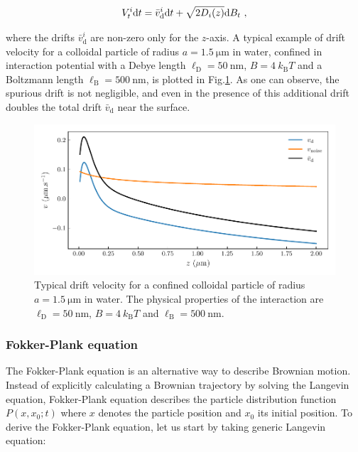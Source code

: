 \begin{equation}
	V_t^i \textnormal{d}t  = \bar{v}_\mathrm{d} ^i \textnormal{d}t + \sqrt{2D_i (z)}  \textnormal{d}B_t ~,
	\label{Eq.langevin_confined}
\end{equation}

where the drifts $\bar{v}_\mathrm{d} ^i $ are non-zero only for the $z$-axis. A typical example of drift velocity for a colloidal particle of radius $a = 1.5 ~\mathrm{\mu m}$ in water, confined in interaction potential with a Debye length $\ell_\mathrm{D} = 50 ~ \mathrm{nm}$, $B = 4 ~k_\mathrm{B}T$ and a Boltzmann length $\ell_\mathrm{B} = 500 ~ \mathrm{nm}$, is plotted in Fig.\ref{fig.spurious}. As one can observe, the spurious drift is not negligible, and even in the presence of this additional drift doubles the total drift $\bar{v}_\mathrm{d}$ near the surface.
\begin{figure}[ht]
	\centering
	\includegraphics{02_body/chapter3/images/spurious_drift/spurious.pdf}
	\caption{Typical drift velocity for a confined colloidal particle of radius $a = 1.5 ~\mathrm{\mu m}$ in water. The physical properties of the interaction are $\ell_\mathrm{D} = 50 ~ \mathrm{nm}$, $B = 4 ~k_\mathrm{B}T$ and $\ell_\mathrm{B} = 500 ~ \mathrm{nm}$.} 
	\label{fig.spurious}
\end{figure}

\subsubsection{Fokker-Plank equation}

The Fokker-Plank equation is an alternative way to describe Brownian motion. Instead of explicitly calculating a Brownian trajectory by solving the Langevin equation, Fokker-Plank equation describes the particle distribution function $P(x, x_0; t)$ where $x$ denotes the particle position and $x_0$ its initial position. To derive the Fokker-Plank equation, let us start by taking generic Langevin equation:

